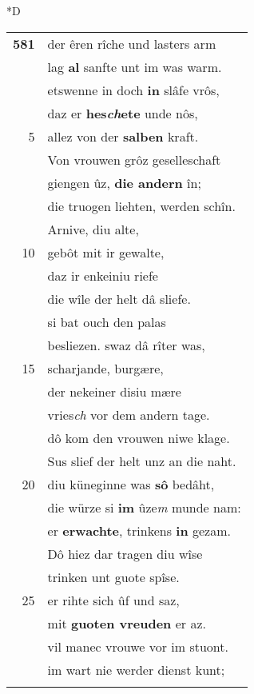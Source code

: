 \documentclass[8pt,a4paper,notitlepage]{article}
\begin{document}
\begin{table}[ht]
\begin{minipage}[t]{0.5\linewidth}
\small
\begin{center}*D
\end{center}
\begin{tabular}{rl}
\textbf{581} & der êren rîche und lasters arm\\ 
 & lag \textbf{al} sanfte unt im was warm.\\ 
 & etswenne in doch \textbf{in} slâfe vrôs,\\ 
 & daz er \textbf{hes\textit{ch}ete} unde nôs,\\ 
5 & allez von der \textbf{salben} kraft.\\ 
 & Von vrouwen grôz geselleschaft\\ 
 & giengen ûz, \textbf{die andern} în;\\ 
 & die truogen liehten, werden schîn.\\ 
 & Arnive, diu alte,\\ 
10 & gebôt mit ir gewalte,\\ 
 & daz ir enkeiniu riefe\\ 
 & die wîle der helt dâ sliefe.\\ 
 & si bat ouch den palas\\ 
 & besliezen. swaz dâ rîter was,\\ 
15 & scharjande, burgære,\\ 
 & der nekeiner disiu mære\\ 
 & vries\textit{ch} vor dem andern tage.\\ 
 & dô kom den vrouwen niwe klage.\\ 
 & Sus slief der helt unz an die naht.\\ 
20 & diu küneginne was \textbf{sô} bedâht,\\ 
 & die würze si \textbf{im} ûze\textit{m} munde nam:\\ 
 & er \textbf{erwachte}, trinkens \textbf{in} gezam.\\ 
 & Dô hiez dar tragen diu wîse\\ 
 & trinken unt guote spîse.\\ 
25 & er rihte sich ûf und saz,\\ 
 & mit \textbf{guoten vreuden} er az.\\ 
 & vil manec vrouwe vor im stuont.\\ 
 & im wart nie werder dienst kunt;\\ 
 & \textit{\begin{large}I\end{large}}r dienst mit zühten wart getân.\\ 

\end{tabular}
\end{minipage}
\end{table}
\end{document}
